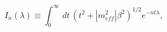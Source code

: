 \begin{equation}
I_{n}\left(\lambda \right)\equiv \int _{0}^{\infty }\, dt\, \left(t^{2}+\left|m_{eff}^{2}\right|\beta ^{2}\right)^{1/2}e^{-nt\lambda },\end{equation}

